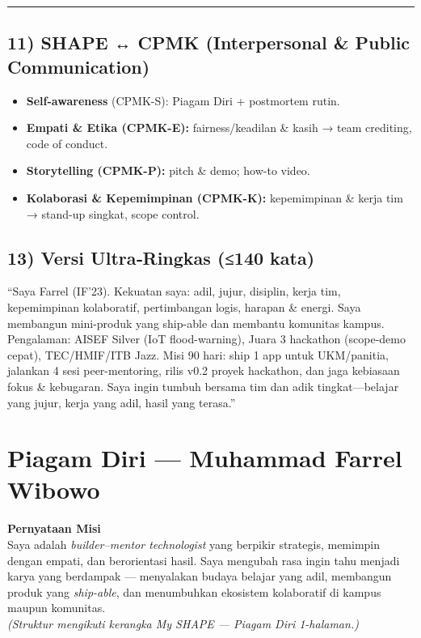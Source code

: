 \documentclass[
  letterpaper,
  DIV=11,
  numbers=noendperiod]{scrreprt}
\begin{document}
\begin{center}\rule{0.5\linewidth}{0.5pt}\end{center}

\section{11) SHAPE ↔ CPMK (Interpersonal \& Public
Communication)}\label{shape-cpmk-interpersonal-public-communication}

\begin{itemize}
\item
  \textbf{Self-awareness} (CPMK-S): Piagam Diri + postmortem rutin.
\item
  \textbf{Empati \& Etika (CPMK-E):} fairness/keadilan \& kasih → team
  crediting, code of conduct.
\item
  \textbf{Storytelling (CPMK-P):} pitch \& demo; how-to video.
\item
  \textbf{Kolaborasi \& Kepemimpinan (CPMK-K):} kepemimpinan \& kerja
  tim → stand-up singkat, scope control.
\end{itemize}

\section{13) Versi Ultra‑Ringkas (≤140
kata)}\label{versi-ultraringkas-140-kata}

``Saya Farrel (IF'23). Kekuatan saya: adil, jujur, disiplin, kerja tim,
kepemimpinan kolaboratif, pertimbangan logis, harapan \& energi. Saya
membangun mini-produk yang ship-able dan membantu komunitas kampus.
Pengalaman: AISEF Silver (IoT flood-warning), Juara 3 hackathon
(scope-demo cepat), TEC/HMIF/ITB Jazz. Misi 90 hari: ship 1 app untuk
UKM/panitia, jalankan 4 sesi peer-mentoring, rilis v0.2 proyek
hackathon, dan jaga kebiasaan fokus \& kebugaran. Saya ingin tumbuh
bersama tim dan adik tingkat---belajar yang jujur, kerja yang adil,
hasil yang terasa.''


\chapter{Piagam Diri --- Muhammad Farrel
Wibowo}\label{piagam-diri-muhammad-farrel-wibowo}

\textbf{Pernyataan Misi}\\
Saya adalah \emph{builder--mentor technologist} yang berpikir strategis,
memimpin dengan empati, dan berorientasi hasil. Saya mengubah rasa ingin
tahu menjadi karya yang berdampak --- menyalakan budaya belajar yang
adil, membangun produk yang \emph{ship-able}, dan menumbuhkan ekosistem
kolaboratif di kampus maupun komunitas.\\
\emph{(Struktur mengikuti kerangka My SHAPE --- Piagam Diri 1-halaman.)}
\end{document}
